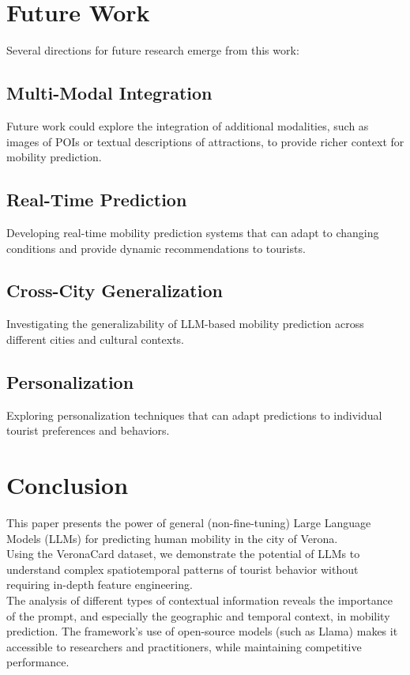 \documentclass[12pt,a4paper]{article}
\begin{document}
\section{Future Work}

Several directions for future research emerge from this work:

\subsection{Multi-Modal Integration}
Future work could explore the integration of additional modalities, such as images of POIs or textual descriptions of attractions, to provide richer context for mobility prediction.

\subsection{Real-Time Prediction}
Developing real-time mobility prediction systems that can adapt to changing conditions and provide dynamic recommendations to tourists.

\subsection{Cross-City Generalization}
Investigating the generalizability of LLM-based mobility prediction across different cities and cultural contexts.

\subsection{Personalization}
Exploring personalization techniques that can adapt predictions to individual tourist preferences and behaviors.

\section{Conclusion}

This paper presents the power of general (non-fine-tuning) Large Language Models (LLMs) for predicting human mobility in the city of Verona.\\
Using the VeronaCard dataset, we demonstrate the potential of LLMs to understand complex spatiotemporal patterns of tourist behavior without requiring in-depth feature engineering.\\

The analysis of different types of contextual information reveals the importance of the prompt, and especially the geographic and temporal context, in mobility prediction. The framework's use of open-source models (such as Llama) makes it accessible to researchers and practitioners, while maintaining competitive performance.\\
\end{document}

